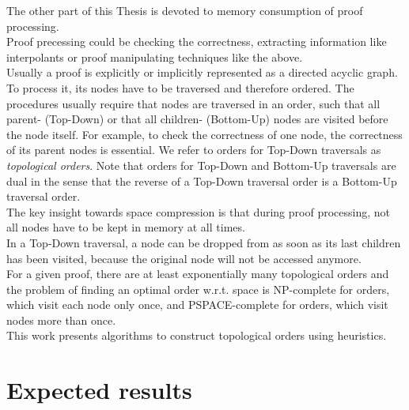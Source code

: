 The other part of this Thesis is devoted to memory consumption of proof processing.\\
Proof precessing could be checking the correctness, extracting information like interpolants or proof manipulating techniques like the above.\\
Usually a proof is explicitly or implicitly represented as a directed acyclic graph.
To process it, its nodes have to be traversed and therefore ordered.
The procedures usually require that nodes are traversed in an order, such that all parent- (Top-Down) or that all children- (Bottom-Up) nodes are visited before the node itself.
For example, to check the correctness of one node, the correctness of its parent nodes is essential. 
We refer to orders for Top-Down traversals as \emph{topological orders}. Note that orders for Top-Down and Bottom-Up traversals are dual in the sense that the reverse of a Top-Down traversal order is a Bottom-Up traversal order.\\
The key insight towards space compression is that during proof processing, not all nodes have to be kept in memory at all times.\\
In a Top-Down traversal, a node can be dropped from as soon as its last children has been visited, because the original node will not be accessed anymore.\\
For a given proof, there are at least exponentially many topological orders and the problem of finding an optimal order w.r.t. space is NP-complete \cite{TODO} for orders, which visit each node only once, and PSPACE-complete \cite{TODO} for orders, which visit nodes more than once.\\
This work presents algorithms to construct topological orders using heuristics.


\section{Expected results}

